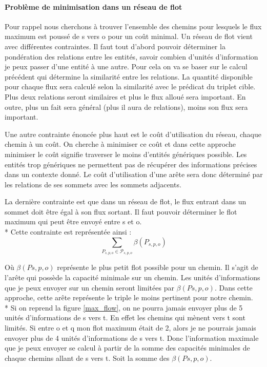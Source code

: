 \paragraph{Problème de minimisation dans un réseau de flot}

Pour rappel nous cherchons à trouver l'ensemble des chemins pour lesquels le flux maximum est poussé de s vers o pour un coût minimal. Un réseau de flot vient avec différentes contraintes. Il faut tout d'abord pouvoir déterminer la pondération des relations entre les entités, savoir combien d'unités d'information je peux passer d'une entité à une autre. Pour cela on va se baser sur le calcul précédent qui détermine la similarité entre les relations. La quantité disponible pour chaque flux sera calculé selon la similarité avec le prédicat du triplet cible. Plus deux relations seront similaires et plus le flux alloué sera important. En outre, plus un fait sera général (plus il aura de relations), moins son flux sera important.

Une autre contrainte énoncée plus haut est le coût d'utilisation du réseau, chaque chemin à un coût. On cherche à minimiser ce coût et dans cette approche minimiser le coût signifie traverser le moins d'entités génériques possible. Les entités trop génériques ne permettent pas de récupérer des informations précises dans un contexte donné. Le coût d'utilisation d'une arête sera donc déterminé par les relations de ses sommets avec les sommets adjacents.

La dernière contrainte est que dans un réseau de flot, le flux entrant dans un sommet doit être égal à son flux sortant. Il faut pouvoir déterminer le flot maximum qui peut être envoyé entre s et o.
\\*
Cette contrainte est représentée ainsi :
\begin{equation}
   \sum\limits_{P_{s,p,o}  \in  \mathcal{P}_{s,p,o}}  \beta(P_{s,p,o})
\end{equation}

Où $ \beta(P s,p,o) $ représente le plus petit flot possible pour un chemin. Il s'agit de l'arête qui possède la capacité minimale sur un chemin. Les unités d'informations que je peux envoyer sur un chemin seront limitées par $ \beta(P s,p,o) $. Dans cette approche, cette arête représente le triple le moins pertinent pour notre chemin.
\\*
Si on reprend la figure \ref{max_flow}, on ne pourra jamais envoyer plus de 5 unités d'informations de s vers t. En effet les chemins qui mènent vers t sont limités. Si entre o et q mon flot maximum était de 2, alors je ne pourrais jamais envoyer plus de 4 unités d'informations de s vers t. Donc l'information maximale que je peux envoyer se calcul à partir de la somme des capacités minimales de chaque chemins allant de s vers t. Soit la somme des $ \beta(P s,p,o) $.

